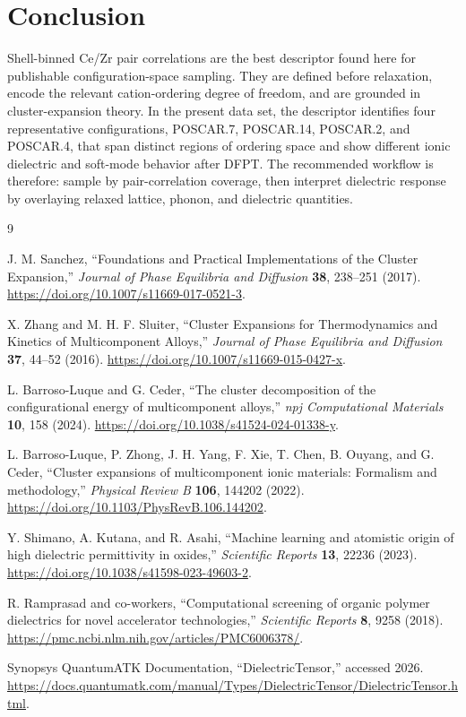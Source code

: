 \documentclass[11pt]{article}
\begin{document}
\section*{Conclusion}
Shell-binned Ce/Zr pair correlations are the best descriptor found here for publishable configuration-space sampling.  They are defined before relaxation, encode the relevant cation-ordering degree of freedom, and are grounded in cluster-expansion theory.  In the present data set, the descriptor identifies four representative configurations, POSCAR.7, POSCAR.14, POSCAR.2, and POSCAR.4, that span distinct regions of ordering space and show different ionic dielectric and soft-mode behavior after DFPT.  The recommended workflow is therefore: sample by pair-correlation coverage, then interpret dielectric response by overlaying relaxed lattice, phonon, and dielectric quantities.

\begin{thebibliography}{9}

J. M. Sanchez, ``Foundations and Practical Implementations of the Cluster Expansion,'' \emph{Journal of Phase Equilibria and Diffusion} \textbf{38}, 238--251 (2017). \url{https://doi.org/10.1007/s11669-017-0521-3}.

X. Zhang and M. H. F. Sluiter, ``Cluster Expansions for Thermodynamics and Kinetics of Multicomponent Alloys,'' \emph{Journal of Phase Equilibria and Diffusion} \textbf{37}, 44--52 (2016). \url{https://doi.org/10.1007/s11669-015-0427-x}.

L. Barroso-Luque and G. Ceder, ``The cluster decomposition of the configurational energy of multicomponent alloys,'' \emph{npj Computational Materials} \textbf{10}, 158 (2024). \url{https://doi.org/10.1038/s41524-024-01338-y}.

L. Barroso-Luque, P. Zhong, J. H. Yang, F. Xie, T. Chen, B. Ouyang, and G. Ceder, ``Cluster expansions of multicomponent ionic materials: Formalism and methodology,'' \emph{Physical Review B} \textbf{106}, 144202 (2022). \url{https://doi.org/10.1103/PhysRevB.106.144202}.

Y. Shimano, A. Kutana, and R. Asahi, ``Machine learning and atomistic origin of high dielectric permittivity in oxides,'' \emph{Scientific Reports} \textbf{13}, 22236 (2023). \url{https://doi.org/10.1038/s41598-023-49603-2}.

R. Ramprasad and co-workers, ``Computational screening of organic polymer dielectrics for novel accelerator technologies,'' \emph{Scientific Reports} \textbf{8}, 9258 (2018). \url{https://pmc.ncbi.nlm.nih.gov/articles/PMC6006378/}.

Synopsys QuantumATK Documentation, ``DielectricTensor,'' accessed 2026. \url{https://docs.quantumatk.com/manual/Types/DielectricTensor/DielectricTensor.html}.

\end{thebibliography}
\end{document}

